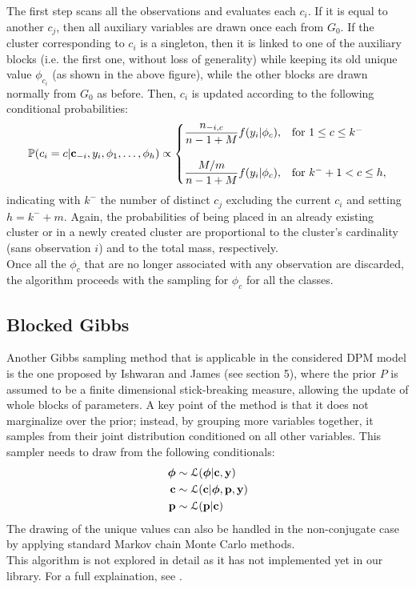 The first step scans all the observations and evaluates each $c_i$.
If it is equal to another $c_j$, then all auxiliary variables are drawn once each from $G_0$.
If the cluster corresponding to $c_i$ is a singleton, then it is linked to one of the auxiliary blocks (i.e. the first one, without loss of generality) while keeping its old unique value $\phi_{c_i}$ (as shown in the above figure), while the other blocks are drawn normally from $G_0$ as before.
Then, $c_i$ is updated according to the following conditional probabilities:
\begin{equation}
	\begin{aligned} \label{neal8prob}
		\mathbb P(c_{i}=c | \mathbf c_{-i}, y_{i}, \phi_{1},\dots,\phi_{h}) \propto
		\begin{cases}
			\dfrac{n_{-i,c}}{n-1+M}f(y_{i}|\phi_{c}), & \mbox{for } 1 \leq c \leq k^{-} \\
			\\
			\dfrac{M/m}{n-1+M}f(y_{i}|\phi_{c}), & \mbox{for } k^{-}+1 < c \leq h,
		\end{cases}
	\end{aligned}
\end{equation}
indicating with $k^{-}$ the number of distinct $c_j$ excluding the current $c_i$ and setting $h=k^{-}+m$.
Again, the probabilities of being placed in an already existing cluster or in a newly created cluster are proportional to the cluster's cardinality (sans observation $i$) and to the total mass, respectively. \\
Once all the $\phi_c$ that are no longer associated with any observation are discarded, the algorithm proceeds with the sampling for $\phi_c$ for all the classes.

\subsection{Blocked Gibbs}
Another Gibbs sampling method that is applicable in the considered DPM model is the one proposed by Ishwaran and James (see \cite{james} section 5), where the prior $P$ is assumed to be a finite dimensional stick-breaking measure, allowing the update of whole blocks of parameters.
A key point of the method is that it does not marginalize over the prior; instead, by grouping more variables together, it samples from their joint distribution conditioned on all other variables.
This sampler needs to draw from the following conditionals:
\begin{align}
	\boldsymbol\phi &\sim \mathcal L(\boldsymbol\phi | \mathbf{c}, \mathbf{y}) \nonumber \\
	\mathbf{c} &\sim \mathcal L (\mathbf{c}| \boldsymbol\phi,\mathbf{p}, \mathbf{y}) \nonumber \\
	\mathbf{p} &\sim \mathcal L (\mathbf{p}| \mathbf{c}) \nonumber
\end{align}
The drawing of the unique values can also be handled in the non-conjugate case by applying standard Markov chain Monte Carlo methods. \\
This algorithm is not explored in detail as it has not implemented yet in our library.
For a full explaination, see \cite{james}.
